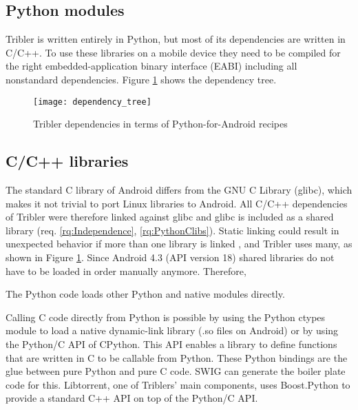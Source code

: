 \subsection{Python modules}
Tribler is written entirely in Python, but most of its dependencies are written in C/C++.
To use these libraries on a mobile device they need to be compiled for the right embedded-application binary interface (EABI) including all nonstandard dependencies.
Figure \ref{fig:dependency_tree} shows the dependency tree.

\begin{figure}[H]
	\centering
	\texttt{[image: dependency\_tree]}
	\caption{Tribler dependencies in terms of Python-for-Android recipes}
	\label{fig:dependency_tree}
\end{figure}


\subsection{C/C++ libraries}\label{sec:libc}
The standard C library of Android differs from the GNU C Library (glibc), which makes it not trivial to port Linux libraries to Android.
All C/C++ dependencies of Tribler were therefore linked against glibc and glibc is included as a shared library (req. \ref{rq:Independence}, \ref{rq:PythonClibs}).
Static linking could result in unexpected behavior if more than one library is linked \cite{android-cpp}, and Tribler uses many, as shown in Figure \ref{fig:dependency_tree}.
Since Android 4.3 (API version 18) shared libraries do not have to be loaded in order manually anymore.
Therefore, 

The Python code loads other Python and native modules directly.

Calling C code directly from Python is possible by using the Python ctypes module to load a native dynamic-link library (.so files on Android) or by using the Python/C API of CPython.
This API enables a library to define functions that are written in C to be callable from Python.
These Python bindings are the glue between pure Python and pure C code.
SWIG can generate the boiler plate code for this.
Libtorrent, one of Triblers' main components, uses Boost.Python to provide a standard C++ API on top of the Python/C API.

